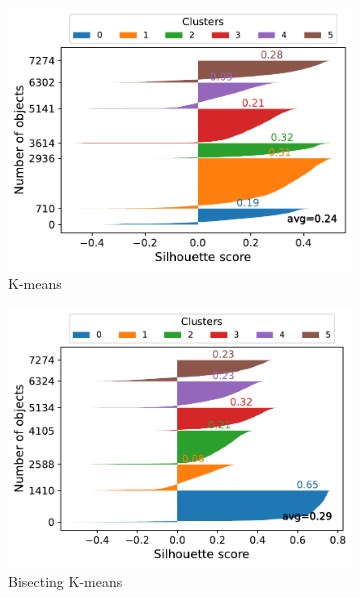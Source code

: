 \documentclass[10pt, a4paper, twocolumn]{article}
\begin{document}
\begin{figure}[t]
    \begin{subfigure}[t]{0.196\textwidth}
        \includegraphics[width=\linewidth]{immagini simone/kmeans_silh.pdf}
        \caption{K-means}
        \label{fig:kmeans_silh}
    \end{subfigure}
    \begin{subfigure}[t]{0.196\textwidth}
        \includegraphics[width=\linewidth]{immagini simone/bisecting_silhouette.pdf}
        \caption{Bisecting K-means}
        \label{fig:bisecting_silh}
    \end{subfigure}
    \begin{subfigure}[t]{0.196\textwidth}

\end{subfigure}
\end{figure}
\end{document}
